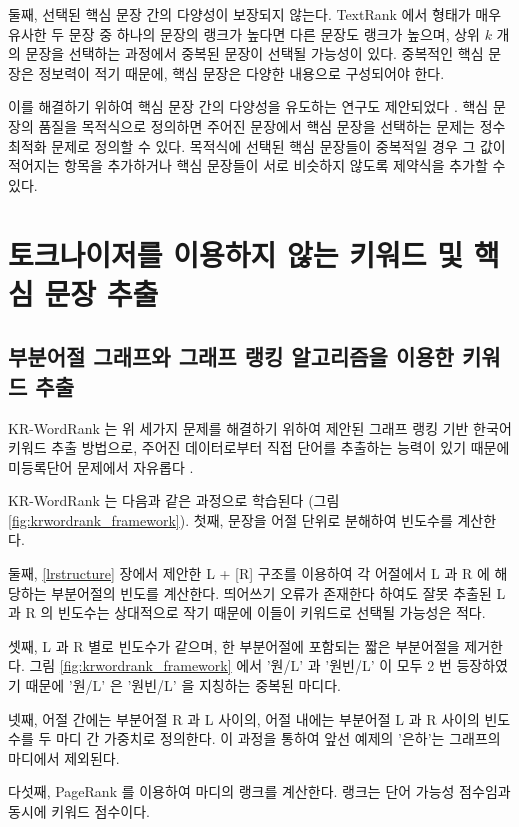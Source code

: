 \documentclass[oneside, ko,phd]{snuthesis_utf8_kor}
\begin{document}
둘째, 선택된 핵심 문장 간의 다양성이 보장되지 않는다.
TextRank 에서 형태가 매우 유사한 두 문장 중 하나의 문장의 랭크가 높다면 다른 문장도 랭크가 높으며, 상위 $k$ 개의 문장을 선택하는 과정에서 중복된 문장이 선택될 가능성이 있다.
중복적인 핵심 문장은 정보력이 적기 때문에, 핵심 문장은 다양한 내용으로 구성되어야 한다.

이를 해결하기 위하여 핵심 문장 간의 다양성을 유도하는 연구도 제안되었다 \cite{mcdonald2007study, parveen2015topical}.
핵심 문장의 품질을 목적식으로 정의하면 주어진 문장에서 핵심 문장을 선택하는 문제는 정수 최적화 문제로 정의할 수 있다.
목적식에 선택된 핵심 문장들이 중복적일 경우 그 값이 적어지는 항목을 추가하거나 핵심 문장들이 서로 비슷하지 않도록 제약식을 추가할 수 있다.


\section{토크나이저를 이용하지 않는 키워드 및 핵심 문장 추출}

\subsection{부분어절 그래프와 그래프 랭킹 알고리즘을 이용한 키워드 추출}

KR-WordRank 는 위 세가지 문제를 해결하기 위하여 제안된 그래프 랭킹 기반 한국어 키워드 추출 방법으로, 주어진 데이터로부터 직접 단어를 추출하는 능력이 있기 때문에 미등록단어 문제에서 자유롭다 \cite{kim2014kr}.

KR-WordRank 는 다음과 같은 과정으로 학습된다 (그림 \ref{fig:krwordrank_framework}).
첫째, 문장을 어절 단위로 분해하여 빈도수를 계산한다.

둘째, \ref{lrstructure} 장에서 제안한 L + [R] 구조를 이용하여 각 어절에서 L 과 R 에 해당하는 부분어절의 빈도를 계산한다.
띄어쓰기 오류가 존재한다 하여도 잘못 추출된 L 과 R 의 빈도수는 상대적으로 작기 때문에 이들이 키워드로 선택될 가능성은 적다.

셋째, L 과 R 별로 빈도수가 같으며, 한 부분어절에 포함되는 짧은 부분어절을 제거한다.
그림 \ref{fig:krwordrank_framework} 에서 '원/L' 과 '원빈/L' 이 모두 2 번 등장하였기 때문에 '원/L' 은 '원빈/L' 을 지칭하는 중복된 마디다.

넷째, 어절 간에는 부분어절 R 과 L 사이의, 어절 내에는 부분어절 L 과 R 사이의 빈도수를 두 마디 간 가중치로 정의한다.
이 과정을 통하여 앞선 예제의 '은하'는 그래프의 마디에서 제외된다.

다섯째, PageRank 를 이용하여 마디의 랭크를 계산한다.
랭크는 단어 가능성 점수임과 동시에 키워드 점수이다.
\end{document}
